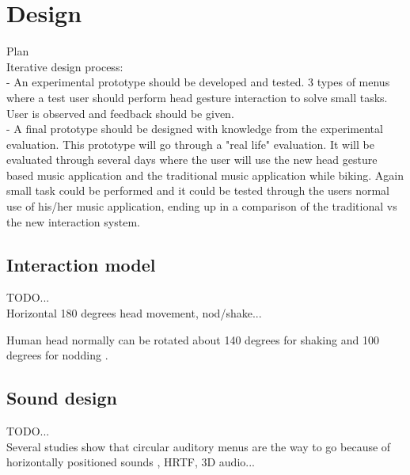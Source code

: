 \chapter{Design}


Plan\\
Iterative design process:\\
- An experimental prototype should be developed and tested. 3 types of menus where a test user should perform head gesture interaction to solve small tasks. User is observed and feedback should be given.\\
- A final prototype should be designed with knowledge from the experimental evaluation. This prototype will go through a "real life" evaluation. It will be evaluated through several days where the user will use the new head gesture based music application and the traditional music application while biking. Again small task could be performed and it could be tested through the users normal use of his/her music application, ending up in a comparison of the traditional vs the new interaction system.

\section{Interaction model}
TODO...\\
Horizontal 180 degrees head movement, nod/shake...

Human head normally can be rotated about 140 degrees for shaking and 100 degrees for nodding \cite{lopresti_neck_2000}.



\section{Sound design}
TODO...\\
Several studies show that circular auditory menus are the way to go because of horizontally positioned sounds , HRTF, 3D audio...



